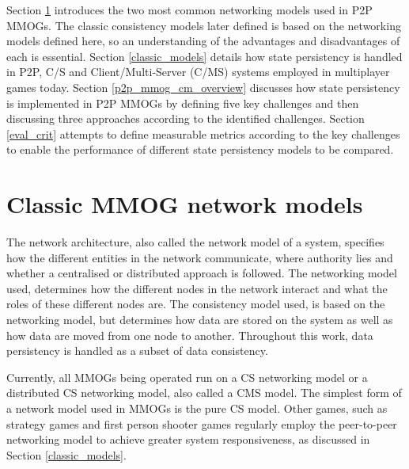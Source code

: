 \documentclass[10pt,a4paper,journal,cspaper,compsoc]{IEEEtran}
\begin{document}
Section \ref{classic_network_models} introduces the two most common networking models used in P2P MMOGs. The classic consistency models later defined
is based on the networking models defined here, so an understanding of the advantages and disadvantages of each is essential.
%
Section \ref{classic_models} details how state persistency is handled in P2P, C/S and Client/Multi-Server (C/MS) systems employed in multiplayer
games today.
%
Section \ref{p2p_mmog_cm_overview} discusses how state persistency is implemented in P2P MMOGs by defining five key challenges and then discussing
three approaches according to the identified challenges.
%
Section \ref{eval_crit} attempts to define measurable metrics according to the key challenges to enable the performance of different state
persistency models to be compared.


\section{Classic MMOG network models}
\label{classic_network_models}

The network architecture, also called the network model of a system, specifies how the different entities in the network communicate, where authority
lies and whether a centralised or distributed approach is followed. The networking model used, determines how the different nodes in the network
interact and what the roles of these different nodes are. The consistency model used, is based on the networking model, but determines how data are
stored on the system as well as how data are moved from one node to another. Throughout this work, data persistency is handled as a subset of data
consistency.

Currently, all MMOGs being operated run on a \ac{CS} networking model or a distributed \ac{CS} networking model, also called a \ac{CMS} model. The
simplest form of a network model used in MMOGs is the pure \ac{CS} model. Other games, such as strategy games and first person shooter games
regularly employ the peer-to-peer networking model to achieve greater system responsiveness, as discussed in Section \ref{classic_models}.
\end{document}
